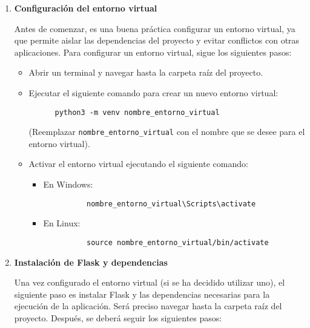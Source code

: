 \begin{enumerate}
\item \textbf{Configuración del entorno virtual}


   Antes de comenzar, es una buena práctica configurar un entorno virtual, ya que permite aislar las dependencias del proyecto y evitar conflictos con otras aplicaciones. Para configurar un entorno virtual, sigue los siguientes pasos:

   \begin{itemize}
    \item Abrir un terminal y navegar hasta la carpeta raíz del proyecto.
    \item Ejecutar el siguiente comando para crear un nuevo entorno virtual:
      \begin{verbatim}
      python3 -m venv nombre_entorno_virtual
      \end{verbatim}
      (Reemplazar \texttt{nombre\_entorno\_virtual} con el nombre que se desee para el entorno virtual).
    \item Activar el entorno virtual ejecutando el siguiente comando:
      \begin{itemize}
        \item En Windows:
          \begin{verbatim}
          nombre_entorno_virtual\Scripts\activate
          \end{verbatim}
        \item En Linux:
          \begin{verbatim}
          source nombre_entorno_virtual/bin/activate
          \end{verbatim}
      \end{itemize}
  \end{itemize}

\item \textbf{Instalación de Flask y dependencias}    

   Una vez configurado el entorno virtual (si se ha decidido utilizar uno), el siguiente paso es instalar Flask y las dependencias necesarias para la ejecución de la aplicación. Será preciso navegar hasta la carpeta raíz del proyecto. Después, se deberá seguir los siguientes pasos:


\end{enumerate}
